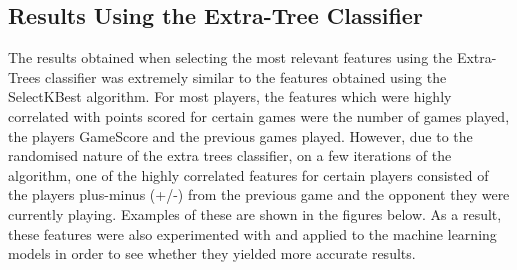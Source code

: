 \documentclass[a4paper,11pt,twoside]{article}
\begin{document}
\subsection{Results Using the Extra-Tree Classifier}

The results obtained when selecting the most relevant features using the Extra-Trees classifier was extremely similar to the features obtained using the SelectKBest algorithm. For most players, the features which were highly correlated with points scored for certain games were the number of games played, the players GameScore and the previous games played. However, due to the randomised nature of the extra trees classifier, on a few iterations of the algorithm, one of the highly correlated features for certain players consisted of the players plus-minus (+/-) from the previous game and the opponent they were currently playing. Examples of these are shown in the figures below. As a result, these features were also experimented with and applied to the machine learning models in order to see whether they yielded more accurate results.
\end{document}

